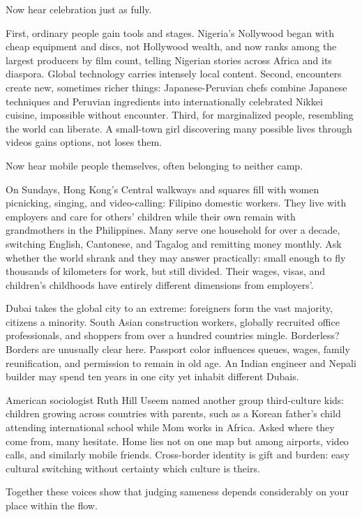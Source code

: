 Now hear celebration just as fully.

First, ordinary people gain tools and stages. Nigeria's Nollywood began with cheap equipment and discs, not Hollywood wealth, and now ranks among the largest producers by film count, telling Nigerian stories across Africa and its diaspora. Global technology carries intensely local content. Second, encounters create new, sometimes richer things: Japanese-Peruvian chefs combine Japanese techniques and Peruvian ingredients into internationally celebrated Nikkei cuisine, impossible without encounter. Third, for marginalized people, resembling the world can liberate. A small-town girl discovering many possible lives through videos gains options, not loses them.

Now hear mobile people themselves, often belonging to neither camp.

On Sundays, Hong Kong's Central walkways and squares fill with women picnicking, singing, and video-calling: Filipino domestic workers. They live with employers and care for others' children while their own remain with grandmothers in the Philippines. Many serve one household for over a decade, switching English, Cantonese, and Tagalog and remitting money monthly. Ask whether the world shrank and they may answer practically: small enough to fly thousands of kilometers for work, but still divided. Their wages, visas, and children's childhoods have entirely different dimensions from employers'.

Dubai takes the global city to an extreme: foreigners form the vast majority, citizens a minority. South Asian construction workers, globally recruited office professionals, and shoppers from over a hundred countries mingle. Borderless? Borders are unusually clear here. Passport color influences queues, wages, family reunification, and permission to remain in old age. An Indian engineer and Nepali builder may spend ten years in one city yet inhabit different Dubais.

American sociologist Ruth Hill Useem named another group third-culture kids: children growing across countries with parents, such as a Korean father's child attending international school while Mom works in Africa. Asked where they come from, many hesitate. Home lies not on one map but among airports, video calls, and similarly mobile friends. Cross-border identity is gift and burden: easy cultural switching without certainty which culture is theirs.

Together these voices show that judging sameness depends considerably on your place within the flow.

